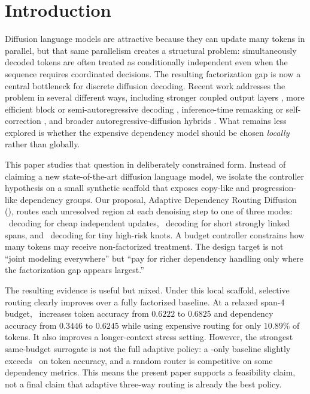 \section{Introduction}

Diffusion language models are attractive because they can update many tokens in parallel, but that same parallelism creates a structural problem: simultaneously decoded tokens are often treated as conditionally independent even when the sequence requires coordinated decisions. The resulting factorization gap is now a central bottleneck for discrete diffusion decoding. Recent work addresses the problem in several different ways, including stronger coupled output layers \citep{li2026codd}, more efficient block or semi-autoregressive decoding \citep{liu2026sdlm,wu2026fastdllmv2}, inference-time remasking or self-correction \citep{wang2025remasking,zhang2026selfcorrection}, and broader autoregressive-diffusion hybrids \citep{fathi2025unifying,sahoo2026esolm}. What remains less explored is whether the expensive dependency model should be chosen \emph{locally} rather than globally.

This paper studies that question in deliberately constrained form. Instead of claiming a new state-of-the-art diffusion language model, we isolate the controller hypothesis on a small synthetic scaffold that exposes copy-like and progression-like dependency groups. Our proposal, Adaptive Dependency Routing Diffusion (\method), routes each unresolved region at each denoising step to one of three modes: \factorized\ decoding for cheap independent updates, \coupled\ decoding for short strongly linked spans, and \micro\ decoding for tiny high-risk knots. A budget controller constrains how many tokens may receive non-factorized treatment. The design target is not ``joint modeling everywhere'' but ``pay for richer dependency handling only where the factorization gap appears largest.''

The resulting evidence is useful but mixed. Under this local scaffold, selective routing clearly improves over a fully factorized baseline. At a relaxed span-4 budget, \method\ increases token accuracy from $0.6222$ to $0.6825$ and dependency accuracy from $0.3446$ to $0.6245$ while using expensive routing for only $10.89\%$ of tokens. It also improves a longer-context stress setting. However, the strongest same-budget surrogate is not the full adaptive policy: a \coupled-only baseline slightly exceeds \method\ on token accuracy, and a random router is competitive on some dependency metrics. This means the present paper supports a feasibility claim, not a final claim that adaptive three-way routing is already the best policy.

